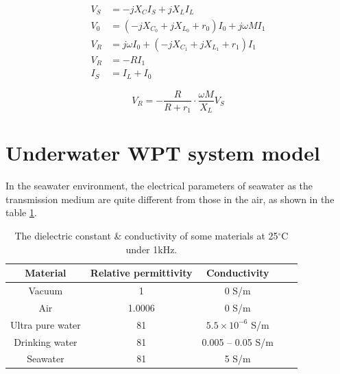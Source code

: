 \begin{equation}
    \begin{align}
        V_S & = -jX_CI_S + j X_{L}I_L                      \\
        V_0 & = (-jX_{C_0}+jX_{L_0}+r_0)I_0 + j\omega MI_1 \\
        V_R & = j\omega I_0 +(-jX_{C_1}+jX_{L_1}+r_1)I_1   \\
        V_R & = -RI_1                                      \\
        I_S & = I_L+I_0
    \end{align}
\end{equation}

\begin{equation}
    V_R = - \frac{R}{R+r_1}\cdot \frac{\omega M}{X_L}V_S
\end{equation}

\section{Underwater WPT system model}

In the seawater environment, the electrical parameters of seawater as the transmission medium are quite different from those in the air, as shown in the table \ref{table:permittivity}.
\begin{table}[htbp]
    \centering
    \caption{The dielectric constant \& conductivity of some materials at 25$^\circ$C under 1kHz.}
    \begin{tabular}{ |c|c|c|m{3.5cm}<{\centering}|m{3.5cm}<{\centering}| }
        \hline
        \textbf{Material} & \textbf{Relative permittivity} & \textbf{Conductivity}    \\\hline
        Vacuum            & 1                              & 0 S/m                    \\ \hline
        Air               & 1.0006                         & 0 S/m                    \\ \hline
        Ultra pure water  & 81                             & $5.5 \times 10^{-6}$ S/m \\ \hline
        Drinking water    & 81                             & 0.005 – 0.05 S/m         \\ \hline
        Seawater          & 81                             & 5 S/m                    \\ \hline
    \end{tabular}
    \label{table:permittivity}
\end{table}

